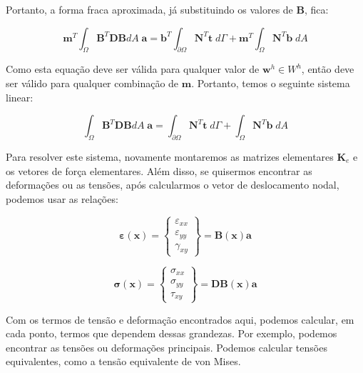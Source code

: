         Portanto, a forma fraca aproximada, já substituindo os valores de $\mathbf{B}$, fica:

        \begin{equation}
            \mathbf{m}^T\int_\Omega  \mathbf{B}^T \mathbf{D} \mathbf{B} dA \; \mathbf{a} = \mathbf{b}^T \int_{\partial \Omega} \mathbf{N}^T \mathbf{t} \; d\Gamma + \mathbf{m}^T \int_\Omega \mathbf{N}^T \mathbf{b} \; dA
        \end{equation}

        Como esta equação deve ser válida para qualquer valor de $\mathbf{w}^h \in W^h$, então deve ser válido para qualquer combinação de $\mathbf{m}$. Portanto, temos o seguinte sistema linear:

        \begin{equation}
            \int_\Omega  \mathbf{B}^T \mathbf{D} \mathbf{B} dA \; \mathbf{a} = \int_{\partial \Omega} \mathbf{N}^T \mathbf{t} \; d\Gamma + \int_\Omega \mathbf{N}^T \mathbf{b} \; dA
        \end{equation}

        Para resolver este sistema, novamente montaremos as matrizes elementares $\mathbf{K}_e$ e os vetores de força elementares. Além disso, se quisermos encontrar as deformações ou as tensões, após calcularmos o vetor de deslocamento nodal, podemos usar as relações:

        \begin{equation*}
            \bm{\varepsilon}(\mathbf{x}) = 
            \begin{Bmatrix}
                \varepsilon_{xx}\\
                \varepsilon_{yy}\\
                \gamma_{xy}
            \end{Bmatrix}=
            \mathbf{B}(\mathbf{x}) \mathbf{a}
        \end{equation*}

        \begin{equation*}
            \bm{\sigma}(\mathbf{x}) = 
            \begin{Bmatrix}
                \sigma_{xx}\\
                \sigma_{yy}\\
                \tau_{xy}
            \end{Bmatrix}=
            \mathbf{D} \mathbf{B}(\mathbf{x}) \mathbf{a}
        \end{equation*}

        Com os termos de tensão e deformação encontrados aqui, podemos calcular, em cada ponto, termos que dependem dessas grandezas. Por exemplo, podemos encontrar as tensões ou deformações principais. Podemos calcular tensões equivalentes, como a tensão equivalente de von Mises. 







